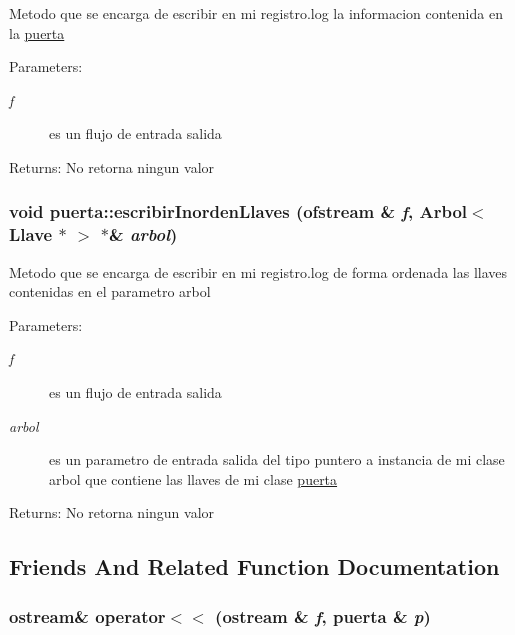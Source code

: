 Metodo que se encarga de escribir en mi registro.log la informacion contenida en la \hyperlink{classpuerta}{puerta} \begin{Desc}
\item[Parameters:]
\begin{description}
\item[{\em f}]es un flujo de entrada salida \end{description}
\end{Desc}
\begin{Desc}
\item[Returns:]No retorna ningun valor \end{Desc}
\hypertarget{classpuerta_be41e285663cf9f509e6fe0583ba4202}{
\subsubsection[escribirInordenLlaves]{\setlength{\rightskip}{0pt plus 5cm}void puerta::escribirInordenLlaves (ofstream \& {\em f}, \/  {\bf Arbol}$<$ {\bf Llave} $\ast$ $>$ $\ast$\& {\em arbol})}}
\label{classpuerta_be41e285663cf9f509e6fe0583ba4202}


Metodo que se encarga de escribir en mi registro.log de forma ordenada las llaves contenidas en el parametro arbol \begin{Desc}
\item[Parameters:]
\begin{description}
\item[{\em f}]es un flujo de entrada salida \item[{\em arbol}]es un parametro de entrada salida del tipo puntero a instancia de mi clase arbol que contiene las llaves de mi clase \hyperlink{classpuerta}{puerta} \end{description}
\end{Desc}
\begin{Desc}
\item[Returns:]No retorna ningun valor \end{Desc}


\subsection{Friends And Related Function Documentation}
\hypertarget{classpuerta_490c20cc328bef002a79831d7d649b47}{
\subsubsection[operator$<$$<$]{\setlength{\rightskip}{0pt plus 5cm}ostream\& operator$<$$<$ (ostream \& {\em f}, \/  {\bf puerta} \& {\em p})}}
\label{classpuerta_490c20cc328bef002a79831d7d649b47}


